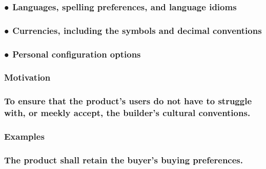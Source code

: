 \documentclass[
]{article}
\begin{document}
\hypertarget{languages-spelling-preferences-and-language-idioms}{%
\subsubsection{\texorpdfstring{● Languages, spelling preferences, and
language idioms
}{● Languages, spelling preferences, and language idioms }}\label{languages-spelling-preferences-and-language-idioms}}

\hypertarget{currencies-including-the-symbols-and-decimal-conventions}{%
\subsubsection{● Currencies, including the symbols and decimal
conventions}\label{currencies-including-the-symbols-and-decimal-conventions}}

\hypertarget{personal-configuration-options}{%
\subsubsection{\texorpdfstring{● Personal configuration options
}{● Personal configuration options }}\label{personal-configuration-options}}

\hypertarget{motivation-32}{%
\subsubsection{Motivation}\label{motivation-32}}

\hypertarget{to-ensure-that-the-products-users-do-not-have-to-struggle-with-or-meekly-accept-the-builders-cultural-conventions.}{%
\subsubsection{To ensure that the product's users do not have to
struggle with, or meekly accept, the builder's cultural
conventions.}\label{to-ensure-that-the-products-users-do-not-have-to-struggle-with-or-meekly-accept-the-builders-cultural-conventions.}}

\hypertarget{examples-17}{%
\subsubsection{Examples}\label{examples-17}}

\hypertarget{the-product-shall-retain-the-buyers-buying-preferences.}{%
\subsubsection{The product shall retain the buyer's buying
preferences.}\label{the-product-shall-retain-the-buyers-buying-preferences.}}
\end{document}

